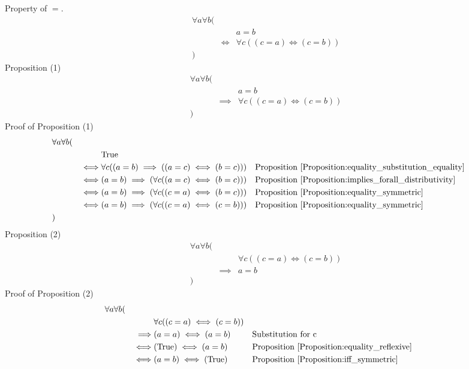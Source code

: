\begin{prop}
\label{Proposition:equality_property_1}
Property of $=$.
\begin{align*}
& \forall a \forall b ( \\
& & & a = b \\
& & \iff & \forall c ((c = a) \iff (c = b)) \\
& )
\end{align*}
Proposition (1)
\begin{align*}
& \forall a \forall b ( \\
& & & a = b \\
& & \implies & \forall c ((c = a) \iff (c = b)) \\
& )
\end{align*}
Proof of Proposition (1)
\begin{align*}
& \forall a \forall b ( \\
& & & \text{True} \\
& & \iff & \forall c ((a = b) \implies ((a = c) \iff (b = c)))
& & \text{Proposition \ref{Proposition:equality_substitution_equality}} \\
& & \iff & (a = b) \implies (\forall c ((a = c) \iff (b = c)))
& & \text{Proposition \ref{Proposition:implies_forall_distributivity}} \\
& & \iff & (a = b) \implies (\forall c ((c = a) \iff (b = c)))
& & \text{Proposition \ref{Proposition:equality_symmetric}} \\
& & \iff & (a = b) \implies (\forall c ((c = a) \iff (c = b)))
& & \text{Proposition \ref{Proposition:equality_symmetric}} \\
& )
\end{align*}
Proposition (2)
\begin{align*}
& \forall a \forall b ( \\
& & & \forall c ((c = a) \iff (c = b)) \\
& & \implies & a = b \\
& )
\end{align*}
Proof of Proposition (2)
\begin{align*}
& \forall a \forall b ( \\
& & & \forall c ((c = a) \iff (c = b)) \\
& & \implies & (a = a) \iff (a = b)
& & \text{Substitution for c} \\
& & \iff & (\text{True}) \iff (a = b)
& & \text{Proposition \ref{Proposition:equality_reflexive}} \\
& & \iff & (a = b) \iff (\text{True})
& & \text{Proposition \ref{Proposition:iff_symmetric}} \\

\end{align*}
\end{prop}
